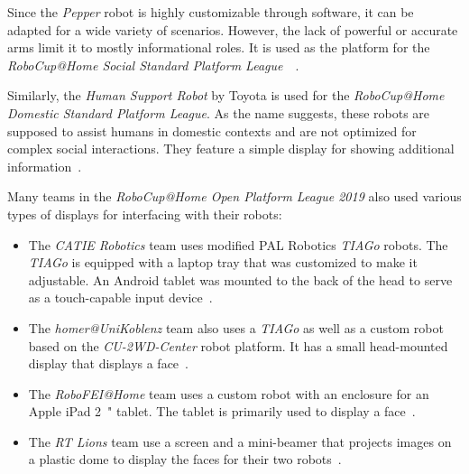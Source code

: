 Since the \textit{Pepper} robot is highly customizable through software, it can be adapted for a wide
variety of scenarios. However, the lack of powerful or accurate arms limit it to mostly informational
roles. It is used as the platform for the \textit{RoboCup@Home Social Standard Platform League}~\
\cite{pepper-robot}.

Similarly, the \textit{Human Support Robot} by Toyota is used for the \textit{RoboCup@Home Domestic
Standard Platform League}. As the name suggests, these robots are supposed to assist humans in
domestic contexts and are not optimized for complex social interactions. They feature a simple
display for showing additional information~\cite{human-support-robot}.

Many teams in the \textit{RoboCup@Home Open Platform League 2019} also used various types of displays
for interfacing with their robots:

\begin{itemize}
    \item The \textit{CATIE Robotics} team uses modified PAL Robotics \textit{TIAGo} robots. The
          \textit{TIAGo} is equipped with a laptop tray that was customized to make it adjustable.
          An Android tablet was mounted to the back of the head to serve as a touch-capable input
          device~\cite{catie-robotics-tdp}.
    \item The \textit{homer@UniKoblenz} team also uses a \textit{TIAGo} as well as a custom robot based
          on the \textit{CU-2WD-Center} robot platform. It has a small head-mounted display that displays
          a face~\cite{homer-at-uni-koblenz-tdp}.
    \item The \textit{RoboFEI@Home} team uses a custom robot with an enclosure for an Apple iPad \SI{2}{"}
          tablet. The tablet is primarily used to display a face~\cite{robo-fei-at-home-tdp}.
    \item The \textit{RT Lions} team use a screen and a mini-beamer that projects images on a plastic
          dome to display the faces for their two robots~\cite{rt-lions-tdp}.
\end{itemize}
